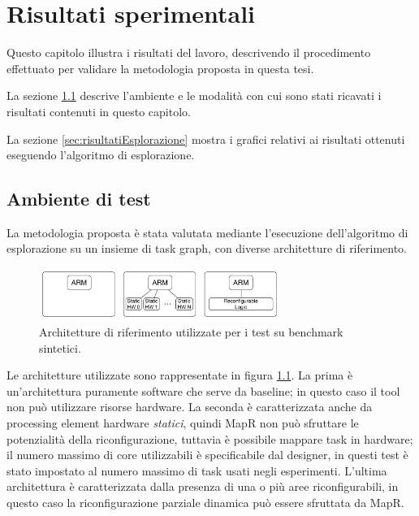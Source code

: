\chapter{Risultati sperimentali}
\label{chap:risultati}
\vspace{1cm}
Questo capitolo illustra i risultati del lavoro, descrivendo
il procedimento effettuato per validare la metodologia proposta
in questa tesi.

La sezione \ref{sec:ambienteTest} descrive l'ambiente e le
modalit\`a con cui sono stati ricavati i risultati contenuti
in questo capitolo.

La sezione \ref{sec:risultatiEsplorazione} mostra i grafici relativi
ai risultati ottenuti eseguendo l'algoritmo di esplorazione.

\newpage

\section{Ambiente di test}
\label{sec:ambienteTest}

La metodologia proposta \`e stata valutata mediante l'esecuzione
dell'algoritmo di esplorazione su un insieme di task graph,
con diverse architetture di riferimento.


\begin{figure}[t]
  \begin{center}
    \includegraphics[width=0.7\textwidth]{./capitoli/figure/cap6/templates.pdf}
    \caption{Architetture di riferimento utilizzate per i test su benchmark sintetici.}
    \label{fig:architettureTestSintetici}
  \end{center}
\end{figure}

Le architetture utilizzate
sono rappresentate in figura \ref{fig:architettureTestSintetici}. La prima \`e un'architettura puramente
software che serve da baseline; in questo caso il tool non pu\`o utilizzare risorse hardware.
La seconda \`e caratterizzata anche da processing element hardware \emph{statici}, quindi MapR non pu\`o
sfruttare le potenzialit\`a della riconfigurazione, tuttavia \`e possibile mappare task in hardware;
il numero massimo di core utilizzabili \`e specificabile dal designer, in questi test
\`e stato impostato al numero massimo di task usati negli esperimenti.
L'ultima architettura \`e caratterizzata dalla presenza di una o pi\`u aree riconfigurabili, in questo
caso la riconfigurazione parziale dinamica pu\`o essere sfruttata da MapR.


